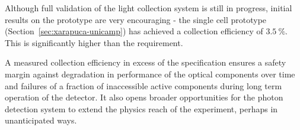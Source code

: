 Although full validation of the   light collection system is still in progress, initial results on the  prototype are very encouraging - the single cell prototype (Section~\ref{sec:xarapuca-unicamp}) has achieved a collection efficiency of $\SI{3.5}{\%}$.  This is significantly higher than the requirement.

A measured collection efficiency in excess of the specification ensures a safety margin against degradation in performance of the optical components over time and failures of a fraction of inaccessible active components during long term operation of the detector. It also opens broader opportunities for the photon detection system to extend the physics reach of the experiment, perhaps in unanticipated ways.

